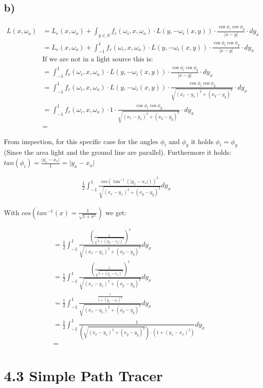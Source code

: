 \documentclass[a4paper]{scrartcl}
\begin{document}
\subsection*{b)}

\begin{align*}
  L(x, \omega_o) &= L_e(x, \omega_o) + \int_{y \in S} f_r(\omega_i, x, \omega_o) \cdot L(y, -\omega_i(x,y)) \cdot \frac{\cos \phi_i \cos \phi_y}{\lvert x - y \rvert} \cdot d y_x \\
  &= L_e(x, \omega_o) + \int_{-1}^{1} f_r(\omega_i, x, \omega_o) \cdot L(y, -\omega_i(x,y)) \cdot \frac{\cos \phi_i \cos \phi_y}{\lvert x - y \rvert} \cdot d y_x \\
  & \text{If we are not in a light source this is: } \\
  &= \int_{-1}^{1} f_r(\omega_i, x, \omega_o) \cdot L(y, -\omega_i(x,y)) \cdot \frac{\cos \phi_i \cos \phi_y}{\lvert x - y \rvert} \cdot d y_x \\
  &= \int_{-1}^{1} f_r(\omega_i, x, \omega_o) \cdot L(y, -\omega_i(x,y)) \cdot \frac{\cos \phi_i \cos \phi_y}{\sqrt{(x_x - y_x)^2 + (x_y - y_y)^2}} \cdot d y_x \\
  &= \int_{-1}^{1} f_r(\omega_i, x, \omega_o) \cdot 1 \cdot \frac{\cos \phi_i \cos \phi_y}{\sqrt{(x_x - y_x)^2 + (x_y - y_y)^2}} \cdot d y_x \\
  &= 
\end{align*}


From inspection, for this specific case for the angles $\phi_i$ and $\phi_y$ it holds $\phi_i = \phi_y$ (Since the area light and the ground line are parallel). 
Furthermore it holds: $tan(\phi_i) = \frac{\lvert y_x - x_x \rvert}{1} = \lvert y_x - x_x \rvert$  

\begin{align*}
  \frac{1}{2} \int_{-1}^{1} \frac{cos(\tan^{-1}(\lvert y_x - x_x \rvert))^2}{\sqrt{(x_x - y_x)^2 + (x_y - y_y)^2}} d y_x
\end{align*}

With $cos(tan^{-1}(x) = \frac{1}{\sqrt{1 + x^2}})$ we get:

\begin{align*}
  &= \frac{1}{2} \int_{-1}^{1} \frac{\left(\frac{1}{\sqrt{1 + (\lvert y_x - x_x \rvert)^2}}\right)^2}{\sqrt{(x_x - y_x)^2 + (x_y - y_y)^2}} d y_x \\
  &= \frac{1}{2} \int_{-1}^{1} \frac{\left(\frac{1}{\sqrt{1 + ( y_x - x_x )^2}}\right)^2}{\sqrt{(x_x - y_x)^2 + (x_y - y_y)^2}} d y_x \\
  &= \frac{1}{2} \int_{-1}^{1} \frac{\frac{1}{1 + ( y_x - x_x )^2}}{\sqrt{(x_x - y_x)^2 + (x_y - y_y)^2}} d y_x \\
  &= \frac{1}{2} \int_{-1}^{1} \frac{1}{(\sqrt{(x_x - y_x)^2 + (x_y - y_y)^2}) \cdot (1 + ( y_x - x_x )^2)} d y_x \\
  &= 
\end{align*}



\section*{4.3 Simple Path Tracer}
\end{document}
